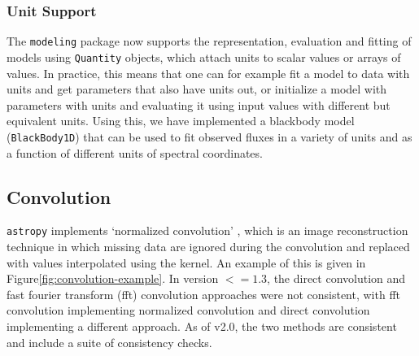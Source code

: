 \documentclass[modern]{aastex61}
\newcommand{\package}[1]{\texttt{#1}\xspace}
\newcommand{\astropypkg}{\package{astropy}}
\renewcommand{\figurename}{Figure\xspace}
\begin{document}
\subsubsection{Unit Support}

The \package{modeling} package now supports the representation, evaluation and fitting of models using \texttt{Quantity} objects, which attach units to scalar values or arrays of values. In practice, this means that one can for example fit a model to data with units and get parameters that also have units out, or initialize a model with parameters with units and evaluating it using input values with different but equivalent units. Using this, we have implemented a blackbody model (\texttt{BlackBody1D}) that can be used to fit observed fluxes in a variety of units and as a function of different units of spectral coordinates.

\subsection{Convolution}

\astropypkg implements `normalized convolution' \citep[e.g.,][]{Knutsson1993}, which is an image reconstruction technique in which missing data are ignored during the convolution and replaced with values interpolated using the kernel.   An example of this is given in \figurename \ref{fig:convolution-example}.  In version $<=1.3$, the direct convolution and fast fourier transform (fft) convolution approaches were not consistent, with fft convolution implementing normalized convolution and direct convolution implementing a different approach.  As of v2.0, the two methods are consistent and include a suite of consistency checks.
\end{document}
